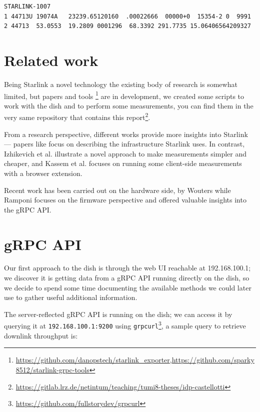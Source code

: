 \documentclass[IN,11pt,twoside,openright,idp,english]{tumthesis}
\begin{document}
\begin{lstlisting}[caption={TLE for satellite STARLINK-1007 },captionpos=b]
STARLINK-1007           
1 44713U 19074A   23239.65120160  .00022666  00000+0  15354-2 0  9991
2 44713  53.0553  19.2809 0001296  68.3392 291.7735 15.06406564209327
\end{lstlisting}
    
\section{Related work}
    
Being Starlink a novel technology the existing body of research is somewhat limited, but papers and tools
\footnote{\url{https://github.com/danopstech/starlink\_exporter},\url{https://github.com/sparky8512/starlink-grpc-tools}}
are in development, we created some scripts to work with the dish and to perform some measurements, you can find them in
the very same repository that contains this report\footnote{\url{https://gitlab.lrz.de/netintum/teaching/tumi8-theses/idp-castellotti}}.
    
From a research perspective, different works provide more insights into Starlink — papers like \cite{pan2023measuring}
focus on describing the infrastructure Starlink uses. In contrast, Izhikevich et al. \cite{izhikevich2023democratizing}
illustrate a novel approach to make measurements simpler and cheaper, and Kassem et al.\cite{browser-side} focuses on
running some client-side measurements with a browser extension.
    
Recent work has been carried out on the hardware side, by Wouters \cite{glitching} while Ramponi \cite{quarkslab}
focuses on the firmware perspective and offered valuable insights into the gRPC API.
    
\section{gRPC API}
    
Our first approach to the dish is through the web UI reachable at 192.168.100.1; we discover it is getting data from a
gRPC API running directly on the dish, so we decide to spend some time documenting the available methods we could later
use to gather useful additional information.
    
The server-reflected gRPC API is running on the dish; we can access it by querying it at \texttt{192.168.100.1:9200}
using \texttt{grpcurl}\footnote{\url{https://github.com/fullstorydev/grpcurl}}, a sample query to retrieve downlink
throughput is:
    
\end{document}
